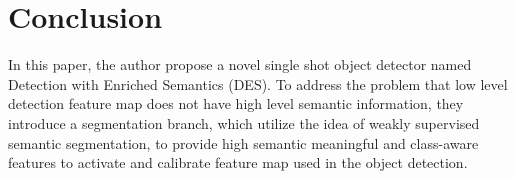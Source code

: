\documentclass[10pt,twocolumn,letterpaper]{article}
\begin{document}
\section{Conclusion}
In this paper, the author propose a novel single shot object detector named Detection with Enriched Semantics (DES). To address the problem that low level detection feature map does not have high level semantic information, they introduce a segmentation branch, which utilize the idea of weakly supervised semantic segmentation, to provide high semantic meaningful and class-aware features to activate and calibrate feature map used in the object detection.
{\small
	
	
	
}
\end{document}
